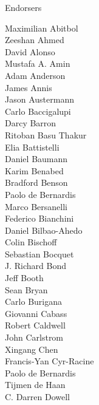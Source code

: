 \documentclass[PICOAPC.tex]{subfiles}
\begin{document}
\vskip -7pt

\Large { \centerline {Endorsers}}
%
\footnotesize {
\begin{multicols}{4}
Maximilian Abitbol              \\
Zeeshan Ahmed                   \\
David Alonso                    \\
Mustafa A. Amin                 \\
Adam Anderson                   \\
James Annis                     \\
Jason Austermann                \\
Carlo Baccigalupi               \\
Darcy Barron                    \\
Ritoban Basu Thakur             \\
Elia Battistelli                \\
Daniel Baumann                  \\
Karim Benabed                   \\
Bradford Benson                 \\
Paolo de Bernardis              \\
Marco Bersanelli                \\
Federico Bianchini              \\
Daniel Bilbao-Ahedo             \\
Colin Bischoff                  \\
Sebastian Bocquet               \\
J. Richard Bond                 \\
Jeff Booth                      \\
Sean Bryan                      \\
Carlo Burigana                  \\
Giovanni Cabass                 \\
Robert Caldwell                 \\
John Carlstrom                  \\
Xingang Chen                    \\
Francis-Yan Cyr-Racine          \\
Paolo de Bernardis              \\
Tijmen de Haan                  \\
C. Darren Dowell                \\

\end{multicols}}
\end{document}
